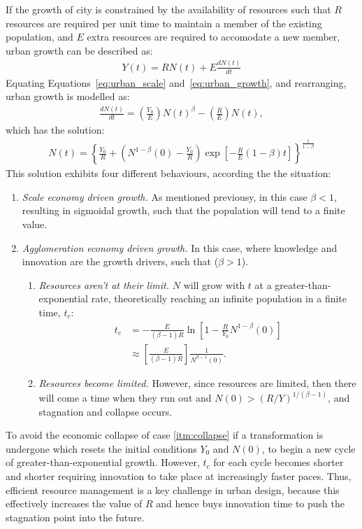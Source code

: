 If the growth of city is constrained by the availability of resources such that $R$ resources are required per unit time to maintain a member of the existing population, and $E$ extra resources are required to accomodate a new member, urban growth can be described as:
\begin{align} \label{eq:urban_growth}
	Y(t)=RN(t)+E\frac{dN(t)}{dt}
\end{align}
Equating Equations~\eqref{eq:urban_scale} and~\eqref{eq:urban_growth}, and rearranging, urban growth is modelled as:
\begin{align*}
	\frac{dN(t)}{dt}=\left(\frac{Y_0}{E}\right)N(t)^{\beta}-\left(\frac{R}{E}\right)N(t),
\end{align*}
which has the solution:
\begin{align}
	N(t)=\left\{\frac{Y_0}{R}+\left(N^{1-\beta}(0)-\frac{Y_0}{R}\right)\exp\left[-\frac{R}{E}(1-\beta)t\right]\right\}^{\frac{1}{1-\beta}}
\end{align}
This solution exhibits four different behaviours, according the the situation:
\begin{enumerate}
	\item \emph{Scale economy driven growth.} As mentioned previousy, in this case $\beta<1$, resulting in sigmoidal growth, such that the population will tend to a finite value.
	\item \label{itm:agglom} \emph{Agglomeration economy driven growth.} In this case, where knowledge and innovation are the growth drivers, such that ($\beta>1$).
	\begin{enumerate}
		\item \emph{Resources aren't at their limit.} $N$ will grow with $t$ at a greater-than-exponential rate, theoretically reaching an infinite population in a finite time, $t_c$:
\begin{align*}
	t_c&=-\frac{E}{(\beta-1)R}\ln\left[1-\frac{R}{Y_0}N^{1-\beta}(0)\right] \\
	&\approx \left[\frac{E}{(\beta-1)R}\right]\frac{1}{N^{\beta-1}(0)}.
\end{align*}
		\item \label{itm:collapse} \emph{Resources become limited.} However, since resources are limited, then there will come a time when they run out and $N(0)>(R/Y)^{1/(\beta-1)}$, and stagnation and collapse occurs. 
	\end{enumerate}
\end{enumerate}
To avoid the economic collapse of case \eqref{itm:collapse} if a transformation is undergone which resets the initial conditions $Y_0$ and $N(0)$, to begin a new cycle of greater-than-exponential growth. However, $t_c$ for each cycle becomes shorter and shorter requiring innovation to take place at increasingly faster paces. Thus, efficient resource management is a key challenge in urban design, because this effectively increases the value of $R$ and hence buys innovation time to push the stagnation point into the future.


